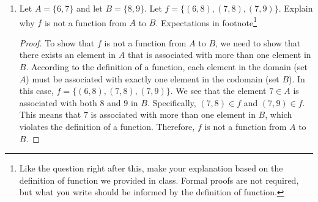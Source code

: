 \documentclass{article}
\begin{document}
\begin{enumerate}
          \begin{proof}
              Let $h \in T$ and assume $h$ plays tennis. We need to show that the chancellor calls $h$.
              Since $h \in T$ and $T \subseteq G$ (by H3), we have $h \in G$. By H5, for all $g \in G$ and for all $u \in U$, if $g$ plays tennis and the ice skating performance featured $u$, then the post office delivers a letter from $g$ to $u$. Applying this to $h \in G$, we get that for all $u \in U$, if the ice skating performance featured $u$, then the post office delivers a letter from $h$ to $u$.
              By H6, for all $u \in U$, the ice skating performance featured $u$. Therefore, for all $u \in U$, the post office delivers a letter from $h$ to $u$. This means that $h \in B$ by the definition of $B$.
              Since $h \in B$ and $B \subseteq S$ (by H4), we have $h \in S$. By H1, for all $c \in S$, the chancellor calls $c$. Applying this to $h \in S$, we get that the chancellor calls $h$.
              Therefore, for all $h \in T$, if $h$ plays tennis, then the chancellor calls $h$.
          \end{proof}

          \newpage

    \item Let $A = \{6,7\}$ and let $B=\{8,9\}$. Let $f=\{(6,8),(7,8),(7,9)\}$. Explain
          why $f$ is not a function from $A$ to $B$. Expectations in
          footnote\footnote{Like the question right after this, make your explanation
              based on the definition of function we provided in class. Formal proofs are not
              required, but what you write should be informed by the definition of function.}

          \begin{proof}
              To show that $f$ is not a function from $A$ to $B$, we need to show that there exists an element in $A$ that is associated with more than one element in $B$. According to the definition of a function, each element in the domain (set $A$) must be associated with exactly one element in the codomain (set $B$).
              In this case, $f = \{(6,8),(7,8),(7,9)\}$. We see that the element $7 \in A$ is associated with both $8$ and $9$ in $B$. Specifically, $(7,8) \in f$ and $(7,9) \in f$. This means that $7$ is associated with more than one element in $B$, which violates the definition of a function.
              Therefore, $f$ is not a function from $A$ to $B$.
          \end{proof}


\end{enumerate}
\end{document}
